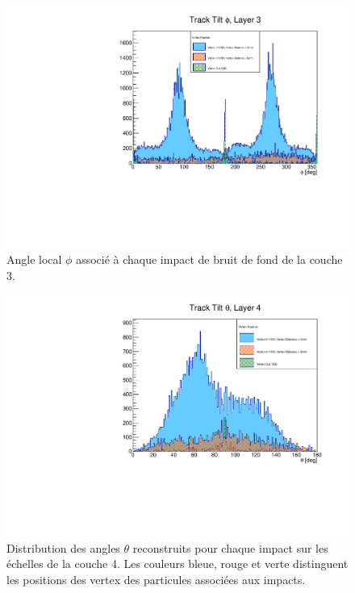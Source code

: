 \begin{appendices}
  \begin{figure}[!htb]
    \centering
    \includegraphics[scale=0.58]{./figures/Track_Tilts_Beamstrahlung/beamstrahlung_Phi/Track_Tilts_Phi_Layer3.pdf}
    \caption{Angle local $\phi$ associ\'e \`a chaque impact de bruit de fond de la couche 3.}
    \label{fig:phi_Layer3}
  \end{figure}
 
  \begin{figure}[!htb]
    \centering
    \includegraphics[scale=0.58]{./figures/Track_Tilts_Beamstrahlung/beamstrahlung_Theta/Track_Tilts_Theta_Layer4.pdf}
    \caption{Distribution des angles $\theta$ reconstruits pour chaque impact sur les \'echelles de la couche 4. Les couleurs bleue, rouge et verte distinguent les positions des vertex des particules associ\'ees aux impacts.}
    \label{fig:theta_Layer4}
  \end{figure}  
  

\end{appendices}
